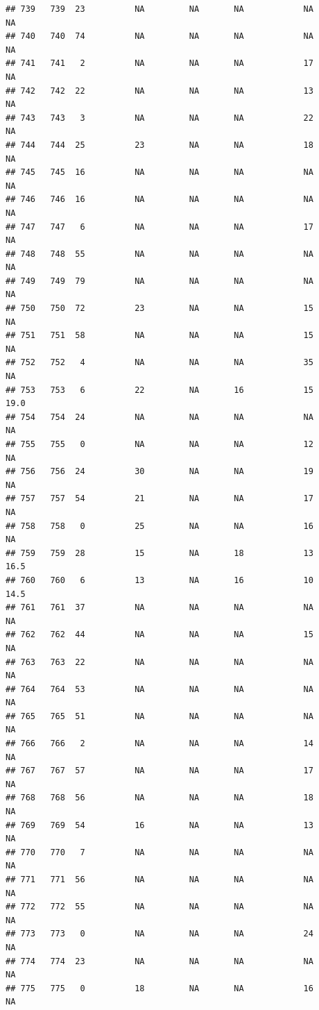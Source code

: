 \documentclass[man]{apa6}
\begin{document}
\begin{verbatim}
## 739   739  23          NA         NA       NA            NA       NA
## 740   740  74          NA         NA       NA            NA       NA
## 741   741   2          NA         NA       NA            17       NA
## 742   742  22          NA         NA       NA            13       NA
## 743   743   3          NA         NA       NA            22       NA
## 744   744  25          23         NA       NA            18       NA
## 745   745  16          NA         NA       NA            NA       NA
## 746   746  16          NA         NA       NA            NA       NA
## 747   747   6          NA         NA       NA            17       NA
## 748   748  55          NA         NA       NA            NA       NA
## 749   749  79          NA         NA       NA            NA       NA
## 750   750  72          23         NA       NA            15       NA
## 751   751  58          NA         NA       NA            15       NA
## 752   752   4          NA         NA       NA            35       NA
## 753   753   6          22         NA       16            15     19.0
## 754   754  24          NA         NA       NA            NA       NA
## 755   755   0          NA         NA       NA            12       NA
## 756   756  24          30         NA       NA            19       NA
## 757   757  54          21         NA       NA            17       NA
## 758   758   0          25         NA       NA            16       NA
## 759   759  28          15         NA       18            13     16.5
## 760   760   6          13         NA       16            10     14.5
## 761   761  37          NA         NA       NA            NA       NA
## 762   762  44          NA         NA       NA            15       NA
## 763   763  22          NA         NA       NA            NA       NA
## 764   764  53          NA         NA       NA            NA       NA
## 765   765  51          NA         NA       NA            NA       NA
## 766   766   2          NA         NA       NA            14       NA
## 767   767  57          NA         NA       NA            17       NA
## 768   768  56          NA         NA       NA            18       NA
## 769   769  54          16         NA       NA            13       NA
## 770   770   7          NA         NA       NA            NA       NA
## 771   771  56          NA         NA       NA            NA       NA
## 772   772  55          NA         NA       NA            NA       NA
## 773   773   0          NA         NA       NA            24       NA
## 774   774  23          NA         NA       NA            NA       NA
## 775   775   0          18         NA       NA            16       NA

\end{verbatim}
\end{document}
